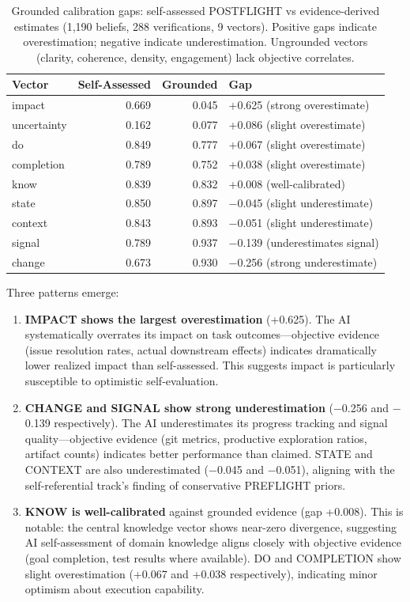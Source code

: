 \begin{table}[h]
\centering
\begin{tabular}{lrrl}
\toprule
\textbf{Vector} & \textbf{Self-Assessed} & \textbf{Grounded} & \textbf{Gap} \\
\midrule
impact & 0.669 & 0.045 & +0.625 (strong overestimate) \\
uncertainty & 0.162 & 0.077 & +0.086 (slight overestimate) \\
do & 0.849 & 0.777 & +0.067 (slight overestimate) \\
completion & 0.789 & 0.752 & +0.038 (slight overestimate) \\
know & 0.839 & 0.832 & +0.008 (well-calibrated) \\
state & 0.850 & 0.897 & $-$0.045 (slight underestimate) \\
context & 0.843 & 0.893 & $-$0.051 (slight underestimate) \\
signal & 0.789 & 0.937 & $-$0.139 (underestimates signal) \\
change & 0.673 & 0.930 & $-$0.256 (strong underestimate) \\
\bottomrule
\end{tabular}
\caption{Grounded calibration gaps: self-assessed POSTFLIGHT vs evidence-derived estimates (1,190 beliefs, 288 verifications, 9 vectors). Positive gaps indicate overestimation; negative indicate underestimation. Ungrounded vectors (clarity, coherence, density, engagement) lack objective correlates.}
\label{tab:grounded-gaps}
\end{table}

Three patterns emerge:

\begin{enumerate}
    \item \textbf{IMPACT shows the largest overestimation} (+0.625). The AI systematically overrates its impact on task outcomes---objective evidence (issue resolution rates, actual downstream effects) indicates dramatically lower realized impact than self-assessed. This suggests impact is particularly susceptible to optimistic self-evaluation.

    \item \textbf{CHANGE and SIGNAL show strong underestimation} ($-$0.256 and $-$0.139 respectively). The AI underestimates its progress tracking and signal quality---objective evidence (git metrics, productive exploration ratios, artifact counts) indicates better performance than claimed. STATE and CONTEXT are also underestimated ($-$0.045 and $-$0.051), aligning with the self-referential track's finding of conservative PREFLIGHT priors.

    \item \textbf{KNOW is well-calibrated} against grounded evidence (gap +0.008). This is notable: the central knowledge vector shows near-zero divergence, suggesting AI self-assessment of domain knowledge aligns closely with objective evidence (goal completion, test results where available). DO and COMPLETION show slight overestimation (+0.067 and +0.038 respectively), indicating minor optimism about execution capability.
\end{enumerate}

